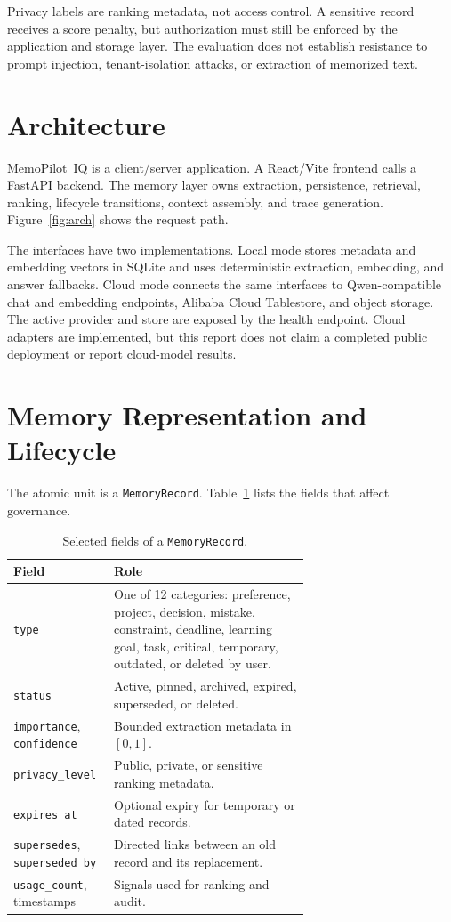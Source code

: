 \documentclass[11pt]{article}
\newcommand{\sysname}{MemoPilot~IQ}
\begin{document}
Privacy labels are ranking metadata, not access control. A sensitive record
receives a score penalty, but authorization must still be enforced by the
application and storage layer. The evaluation does not establish resistance to
prompt injection, tenant-isolation attacks, or extraction of memorized text.

\section{Architecture}
\label{sec:architecture}

\sysname{} is a client/server application. A React/Vite frontend calls a
FastAPI backend. The memory layer owns extraction, persistence, retrieval,
ranking, lifecycle transitions, context assembly, and trace generation.
Figure~\ref{fig:arch} shows the request path.



The interfaces have two implementations. Local mode stores metadata and
embedding vectors in SQLite and uses deterministic extraction, embedding, and
answer fallbacks. Cloud mode connects the same interfaces to Qwen-compatible
chat and embedding endpoints, Alibaba Cloud Tablestore, and object storage. The
active provider and store are exposed by the health endpoint. Cloud adapters
are implemented, but this report does not claim a completed public deployment
or report cloud-model results.

\section{Memory Representation and Lifecycle}
\label{sec:schema}

The atomic unit is a \texttt{MemoryRecord}. Table~\ref{tab:fields} lists the
fields that affect governance.

\begin{table}[tbp]
\centering
\small
\caption{Selected fields of a \texttt{MemoryRecord}.}
\label{tab:fields}
\begin{tabular}{@{}lp{0.66\linewidth}@{}}
\toprule
\textbf{Field} & \textbf{Role} \\
\midrule
\texttt{type} & One of 12 categories: preference, project, decision, mistake,
constraint, deadline, learning goal, task, critical, temporary, outdated, or
deleted by user. \\
\texttt{status} & Active, pinned, archived, expired, superseded, or deleted. \\
\texttt{importance}, \texttt{confidence} & Bounded extraction metadata in
$[0,1]$. \\
\texttt{privacy\_level} & Public, private, or sensitive ranking metadata. \\
\texttt{expires\_at} & Optional expiry for temporary or dated records. \\
\texttt{supersedes}, \texttt{superseded\_by} & Directed links between an old
record and its replacement. \\
\texttt{usage\_count}, timestamps & Signals used for ranking and audit. \\
\bottomrule
\end{tabular}
\end{table}
\end{document}

